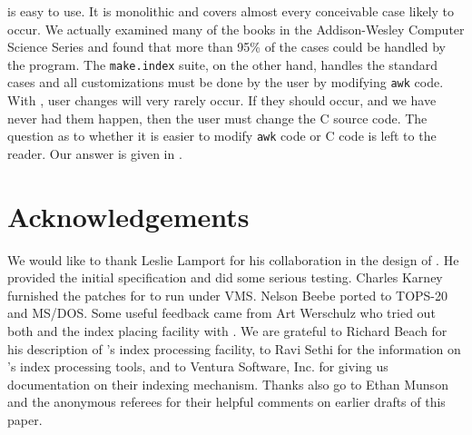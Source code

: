{\MI} is easy to use.  It is monolithic and covers almost every conceivable
case likely to occur.  We actually examined many of the books in the
Addison-Wesley Computer Science Series and found that more than 95\% of the
cases could be handled by the program.  The \verb|make.index| suite, on the
other hand, handles the standard cases and all customizations must be done
by the user by modifying \verb|awk| code.  With {\MI}, user changes will 
very rarely occur.  If they should occur, and we have never had them happen,
then the user must change the C source code.  The question as to whether it is
easier to modify \verb|awk| code or C code is left to the reader.
Our answer is given in {\MI}.


\section{Acknowledgements}
We would like to thank Leslie Lamport for his collaboration in the design
of {\MI}.  He provided the initial specification and did some serious testing.
Charles Karney furnished the patches for {\MI} to run under VMS.
Nelson Beebe ported {\MI} to TOPS-20 and MS/DOS.
Some useful feedback came from Art Werschulz who tried out both {\MI}
and the index placing facility with {\AmSTeX}.
We are grateful to Richard Beach for his description of {\TG}'s
index processing facility, to Ravi Sethi for the information on {\TF}'s
index processing tools, and to Ventura Software, Inc. for giving us
documentation on their indexing mechanism.
Thanks also go to Ethan Munson and the anonymous referees for their helpful
comments on earlier drafts of this paper.

% 
% 

{\small
\singlespace

}

